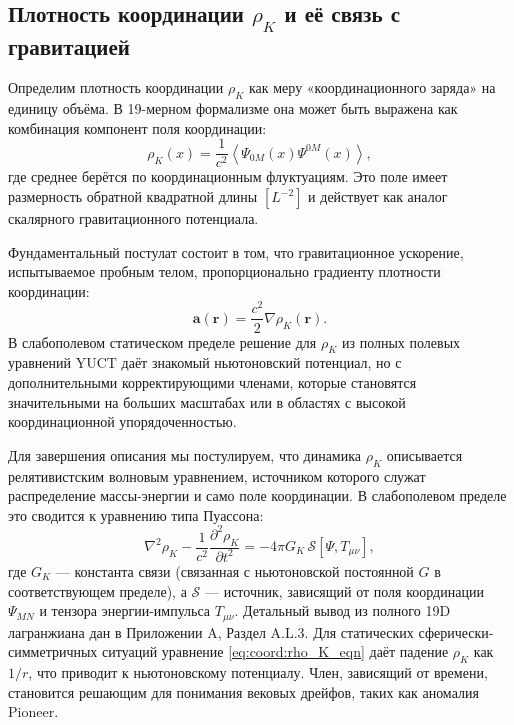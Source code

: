 \documentclass[12pt,a4paper]{article}
\theoremstyle{remark}
\begin{document}
	\subsection{Плотность координации $\rho_K$ и её связь с гравитацией}
	\label{subsec:rho_K_definition}
	
	Определим плотность координации $\rho_K$ как меру «координационного заряда» на единицу объёма. В 19-мерном формализме она может быть выражена как комбинация компонент поля координации:
	\begin{equation}
		\rho_K(x) = \frac{1}{c^2} \left\langle \Psi_{0M}(x) \Psi^{0M}(x) \right\rangle,
		\label{eq:coord:rho_K_def}
	\end{equation}
	где среднее берётся по координационным флуктуациям. Это поле имеет размерность обратной квадратной длины $[L^{-2}]$ и действует как аналог скалярного гравитационного потенциала.
	
	Фундаментальный постулат состоит в том, что гравитационное ускорение, испытываемое пробным телом, пропорционально градиенту плотности координации:
	\begin{equation}
		\mathbf{a}(\mathbf{r}) = \frac{c^2}{2} \nabla \rho_K(\mathbf{r}).
		\label{eq:coord:grav_from_rho}
	\end{equation}
	В слабополевом статическом пределе решение для $\rho_K$ из полных полевых уравнений YUCT даёт знакомый ньютоновский потенциал, но с дополнительными корректирующими членами, которые становятся значительными на больших масштабах или в областях с высокой координационной упорядоченностью.
	
	Для завершения описания мы постулируем, что динамика $\rho_K$ описывается релятивистским волновым уравнением, источником которого служат распределение массы-энергии и само поле координации. В слабополевом пределе это сводится к уравнению типа Пуассона:
	\begin{equation}
		\nabla^2 \rho_K - \frac{1}{c^2}\frac{\partial^2 \rho_K}{\partial t^2} = -4\pi G_K \, \mathcal{S}[\Psi, T_{\mu\nu}],
		\label{eq:coord:rho_K_eqn}
	\end{equation}
	где $G_K$ — константа связи (связанная с ньютоновской постоянной $G$ в соответствующем пределе), а $\mathcal{S}$ — источник, зависящий от поля координации $\Psi_{MN}$ и тензора энергии-импульса $T_{\mu\nu}$. Детальный вывод из полного 19D лагранжиана дан в Приложении A, Раздел A.L.3. Для статических сферически-симметричных ситуаций уравнение \eqref{eq:coord:rho_K_eqn} даёт падение $\rho_K$ как $1/r$, что приводит к ньютоновскому потенциалу. Член, зависящий от времени, становится решающим для понимания вековых дрейфов, таких как аномалия Pioneer.
	
\end{document}
